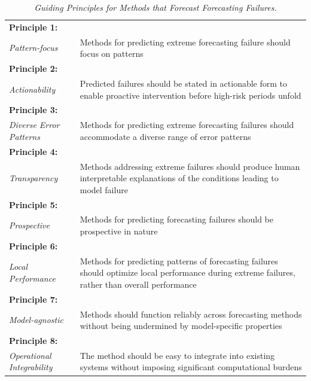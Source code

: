\documentclass[]{interact}
\theoremstyle{plain}
\theoremstyle{definition}
\theoremstyle{remark}
\begin{document}
\begin{table}
\centering
\caption{\textit{Guiding Principles for Methods that Forecast Forecasting Failures.}}
\small
\renewcommand{\arraystretch}{1.3}
\begin{tabular}{|m{2.7cm}|m{12.5cm}|}
\hline
\centering\textbf{Principle 1:} \\ \centering\textit{Pattern-focus}
  & Methods for predicting extreme forecasting failure should focus on patterns \\
\hline
\centering\textbf{Principle 2:} \\ \centering\textit{Actionability}
  & Predicted failures should be stated in actionable form to enable proactive intervention
    before high-risk periods unfold \\
\hline
\centering\textbf{Principle 3:} \\ \centering\textit{Diverse Error Patterns}
  & Methods for predicting extreme forecasting failures should accommodate a diverse range
    of error patterns \\
\hline
\centering\textbf{Principle 4:} \\ \centering\textit{Transparency}
  & Methods addressing extreme failures should produce human interpretable explanations of
    the conditions leading to model failure \\
\hline
\centering\textbf{Principle 5:} \\ \centering\textit{Prospective}
  & Methods for predicting forecasting failures should be prospective in nature \\
\hline
\centering\textbf{Principle 6:} \\ \centering\textit{Local Performance}
  & Methods for predicting patterns of forecasting failures should optimize local
    performance during extreme failures, rather than overall performance \\
\hline
\centering\textbf{Principle 7:} \\ \centering\textit{Model-agnostic}
  & Methods should function reliably across forecasting methods without being undermined by
    model-specific properties \\
\hline
\centering\textbf{Principle 8:} \\ \centering\textit{Operational Integrability}
  & The method should be easy to integrate into existing systems without imposing
    significant computational burdens \\
\hline
\end{tabular}
\label{tab:principles}
\end{table}
\end{document}
